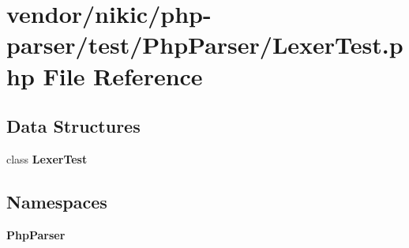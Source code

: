 \section{vendor/nikic/php-\/parser/test/\+Php\+Parser/\+Lexer\+Test.php File Reference}
\label{_lexer_test_8php}
\subsection*{Data Structures}
\begin{DoxyCompactItemize}
\item 
class {\bf Lexer\+Test}
\end{DoxyCompactItemize}
\subsection*{Namespaces}
\begin{DoxyCompactItemize}
\item 
 {\bf Php\+Parser}
\end{DoxyCompactItemize}

